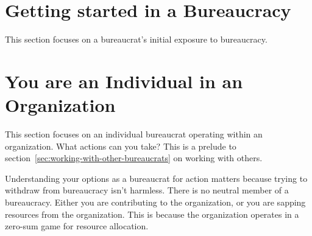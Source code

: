 \documentclass{book}
\begin{document}

  \chapter{Getting started in a Bureaucracy\label{sec:getting-started}}
    This section focuses on a bureaucrat's initial exposure to bureaucracy. 
  
    
    
    
    
    
    
    
    
    
  \clearpage
  \chapter{You are an Individual in an Organization\label{sec:individual_in_org}}
  
    This section focuses on an individual bureaucrat operating within an organization. What actions can you take?  This is a prelude to section~\ref{sec:working-with-other-bureaucrats} on working with others.
    
    Understanding your options as a bureaucrat for action matters because trying to withdraw from bureaucracy isn't harmless. There is no neutral member of a bureaucracy. Either you are contributing to the organization, or you are sapping resources from the organization. This is because the organization operates in a zero-sum game for resource allocation.
    
    
    
    
    
  \clearpage
    
    
    
    
    
    
    
    
  \clearpage

\end{document}
